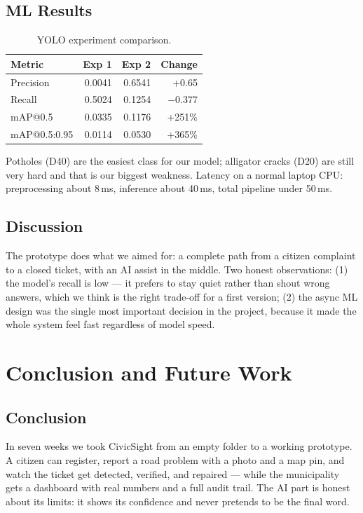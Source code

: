 \documentclass{tietreport}
\begin{document}
\clearpage
\section{ML Results}

\begin{table}[H]
\centering
\begin{tabular}{|l|r|r|r|}
\hline
\textbf{Metric} & \textbf{Exp 1} & \textbf{Exp 2} & \textbf{Change} \\
\hline
Precision & 0.0041 & 0.6541 & +0.65 \\
\hline
Recall & 0.5024 & 0.1254 & $-$0.377 \\
\hline
mAP@0.5 & 0.0335 & 0.1176 & +251\% \\
\hline
mAP@0.5:0.95 & 0.0114 & 0.0530 & +365\% \\
\hline
\end{tabular}
\caption{YOLO experiment comparison.}
\end{table}

Potholes (D40) are the easiest class for our model; alligator cracks (D20) are still very hard and that is our biggest weakness. Latency on a normal laptop CPU: preprocessing about 8\,ms, inference about 40\,ms, total pipeline under 50\,ms.


\section{Discussion}

The prototype does what we aimed for: a complete path from a citizen complaint to a closed ticket, with an AI assist in the middle. Two honest observations: (1) the model's recall is low --- it prefers to stay quiet rather than shout wrong answers, which we think is the right trade-off for a first version; (2) the async ML design was the single most important decision in the project, because it made the whole system feel fast regardless of model speed.

\chapter{Conclusion and Future Work}


\section{Conclusion}

In seven weeks we took CivicSight from an empty folder to a working prototype. A citizen can register, report a road problem with a photo and a map pin, and watch the ticket get detected, verified, and repaired --- while the municipality gets a dashboard with real numbers and a full audit trail. The AI part is honest about its limits: it shows its confidence and never pretends to be the final word.
\end{document}

